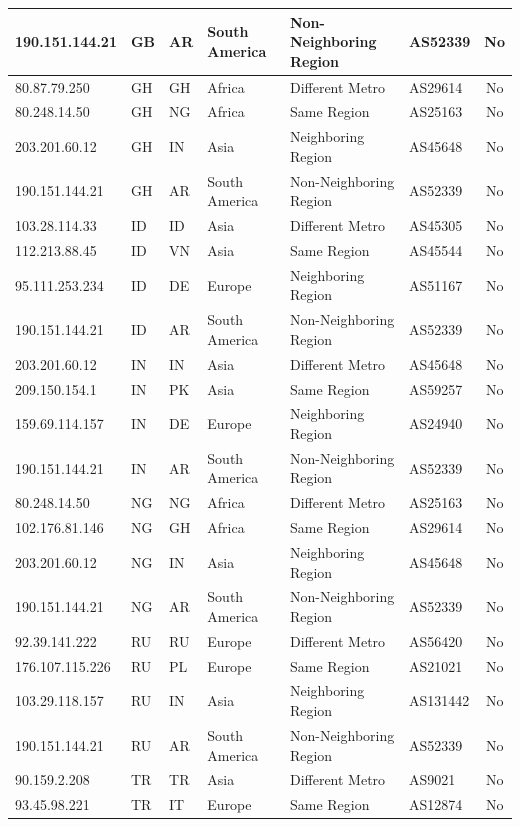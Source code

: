 \begin{table}[h]
\begin{tabular}{|l|l|l|l|l|l|c|}
		190.151.144.21 & GB & AR & South America & Non-Neighboring Region & AS52339 & No \\
		\hline
		80.87.79.250 & GH & GH & Africa & Different Metro & AS29614 & No \\
		80.248.14.50 & GH & NG & Africa & Same Region & AS25163 & No \\
		203.201.60.12 & GH & IN & Asia & Neighboring Region & AS45648 & No \\
		190.151.144.21 & GH & AR & South America & Non-Neighboring Region & AS52339 & No \\
		\hline
		103.28.114.33 & ID & ID & Asia & Different Metro & AS45305 & No \\
		112.213.88.45 & ID & VN & Asia & Same Region & AS45544 & No \\
		95.111.253.234 & ID & DE & Europe & Neighboring Region & AS51167 & No \\
		190.151.144.21 & ID & AR & South America & Non-Neighboring Region & AS52339 & No \\
		\hline
		203.201.60.12 & IN & IN & Asia & Different Metro & AS45648 & No \\
		209.150.154.1 & IN & PK & Asia & Same Region & AS59257 & No \\
		159.69.114.157 & IN & DE & Europe & Neighboring Region & AS24940 & No \\
		190.151.144.21 & IN & AR & South America & Non-Neighboring Region & AS52339 & No \\
		\hline
		80.248.14.50 & NG & NG & Africa & Different Metro & AS25163 & No \\
		102.176.81.146 & NG & GH & Africa & Same Region & AS29614 & No \\
		203.201.60.12 & NG & IN & Asia & Neighboring Region & AS45648 & No \\
		190.151.144.21 & NG & AR & South America & Non-Neighboring Region & AS52339 & No \\
		\hline
		92.39.141.222 & RU & RU & Europe & Different Metro & AS56420 & No \\
		176.107.115.226 & RU & PL & Europe & Same Region & AS21021 & No \\
		103.29.118.157 & RU & IN & Asia & Neighboring Region & AS131442 & No \\
		190.151.144.21 & RU & AR & South America & Non-Neighboring Region & AS52339 & No \\
		\hline
		90.159.2.208 & TR & TR & Asia & Different Metro & AS9021 & No \\
		93.45.98.221 & TR & IT & Europe & Same Region & AS12874 & No \\

\end{tabular}
\end{table}
